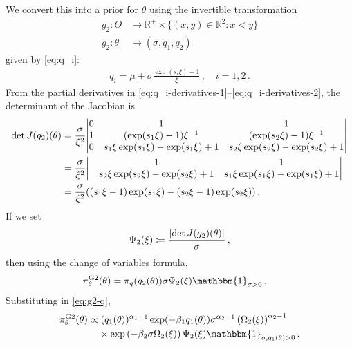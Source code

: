 \documentclass{article}
\DeclarePairedDelimiter\abs{\lvert}{\rvert}
\newcommand{\R}{\mathbb{R}}
\begin{document}
%
We convert this into a prior for $\theta$
using the invertible transformation
%
\begin{align*}
	g_2 \colon \Theta &\to \R^+ \times \{(x, y) \in \R^2 \colon x < y\} \\
	g_2 \colon \theta &\mapsto (\sigma, q_{1}, q_{2})
\end{align*}
%
given by \eqref{eq:q_i}:
%
\begin{align*}
	q_i = \mu + \sigma \frac{\exp(s_i \xi) - 1}{\xi} \,, \quad i = 1, 2 \,.
\end{align*}
%
From the partial derivatives in
\eqref{eq:q_i-derivatives-1}--\eqref{eq:q_i-derivatives-2},
the determinant of the Jacobian is
%
\begin{align*}
	\det J(g_2)(\theta)
	&= \frac{\sigma}{\xi ^ 2} \abs*{
			\begin{matrix}
			0 &1 &1 \\
			1 &(\exp(s_1 \xi) - 1)\xi ^ {-1} &(\exp(s_2 \xi) - 1)\xi^{-1}  \\
			0 &s_1 \xi \exp(s_1 \xi) -\exp(s_1 \xi) + 1
				&s_2 \xi \exp(s_2 \xi) -\exp(s_2 \xi) + 1 \\
			\end{matrix} } \\
	&= \frac{\sigma}{\xi ^ 2} \abs*{
			\begin{matrix}
			&1 &1 \\
			&s_2 \xi \exp(s_2 \xi) -\exp(s_2 \xi) + 1
				&s_1 \xi \exp(s_1 \xi) -\exp(s_1 \xi) + 1 \\
			\end{matrix} } \\
	&= \frac{\sigma}{\xi ^ {2} }
		((s_1 \xi - 1) \exp(s_1 \xi) - (s_2 \xi - 1) \exp(s_2 \xi)) \,.
\end{align*}
%
If we set
\begin{align*}
	\Psi_2(\xi) \coloneqq \frac{\abs{\det J(g_2)(\theta)}}{\sigma} \,,
\end{align*}
%
then using the change of variables formula,
%
\begin{align*}
	\pi^{\text{G2}}_\theta(\theta)
		&= \pi_q(g_2(\theta)) \sigma \Psi_2(\xi)
		\mathbbm{1}_{\sigma > 0} \,.
\end{align*}
%
Substituting in \eqref{eq:g2-q},
%
\begin{align*}
	\pi^{\text{G2}}_\theta(\theta)
		&\propto (q_{1}(\theta)) ^ {\alpha_1 - 1} \exp(-\beta_1 q_{1}(\theta))
		\sigma ^ {\alpha_2 - 1} \left(\Omega_2(\xi)\right) ^ {\alpha_2 - 1}\\
	&\ \phantom{=} \times \exp\left(-\beta_2 \sigma \Omega_2(\xi)\right) \Psi_2(\xi)
		\mathbbm{1}_{\sigma, q_1(\theta) > 0} \,.
\end{align*}
\end{document}
